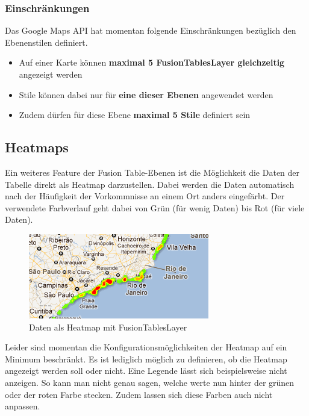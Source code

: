 \subsubsection{Einschränkungen}
\label{fusiontableslayer-styles-restrictions}
Das Google Maps API hat momentan folgende Einschränkungen bezüglich den Ebenenstilen definiert.

\begin{itemize}
\item Auf einer Karte können \textbf{maximal 5 FusionTablesLayer gleichzeitig} angezeigt werden
\item Stile können dabei nur für \textbf{eine dieser Ebenen} angewendet werden
\item Zudem dürfen für diese Ebene \textbf{maximal 5 Stile} definiert sein
\end{itemize}

\subsection{Heatmaps}
Ein weiteres Feature der Fusion Table-Ebenen ist die Möglichkeit die Daten der Tabelle direkt als Heatmap darzustellen. Dabei werden die Daten automatisch nach der Häufigkeit der Vorkommnisse an einem Ort anders eingefärbt. Der verwendete Farbverlauf geht dabei von Grün (für wenig Daten) bis Rot (für viele Daten).

\begin{figure}[!h]
	\centering
	\includegraphics{images/einfuehrung/gmap_fusiontableslayer_heatmap}
	\caption{Daten als Heatmap mit FusionTablesLayer}
	\label{fusiontableslayer-heatmap}
\end{figure}

Leider sind momentan die Konfigurationsmöglichkeiten der Heatmap auf ein Minimum beschränkt. Es ist lediglich möglich zu definieren, ob die Heatmap angezeigt werden soll oder nicht. Eine Legende lässt sich beispielsweise nicht anzeigen. So kann man nicht genau sagen, welche werte nun hinter der grünen oder der roten Farbe stecken. Zudem lassen sich diese Farben auch nicht anpassen.

